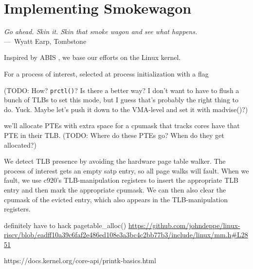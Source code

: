 
\chapter{Implementing Smokewagon}
\label{ch:Implementation}

\begin{epigraph}
	\emph{Go ahead. Skin it. Skin that smoke wagon and see what happens.} \\
	---~Wyatt Earp, Tombstone
\end{epigraph}

Inspired by ABIS \cite{amit_optimizing_2017}, we base our efforts on the Linux kernel.

For a process of interest, selected at process initialization with a flag

(TODO: How? \verb+prctl()+? Is there a better way? I don't want to have to flush a bunch of TLBs to set this mode, but I guess that's probably the right thing to do. Yuck. Maybe let's push it down to the VMA-level and set it with madvise()?)

we'll allocate PTEs with extra space for a cpumask that tracks cores have that PTE in their TLB. (TODO: Where do these PTEs go? When do they get allocated?)

We detect TLB presence by avoiding the hardware page table walker. The process of interest gets an empty satp entry, so all page walks will fault. When we fault, we use c920's TLB-manipulation registers to insert the appropriate TLB entry and then mark the appropriate cpumask. We can then also clear the cpumask of the evicted entry, which also appears in the TLB-manipulation registers.

definitely have to hack {pagetable\_alloc()} \url{https://github.com/johndeppe/linux-riscv/blob/eadff10a39c6faf2e486ed108e3a3bc4c2bb77b3/include/linux/mm.h#L2851}

https://docs.kernel.org/core-api/printk-basics.html

\endinput